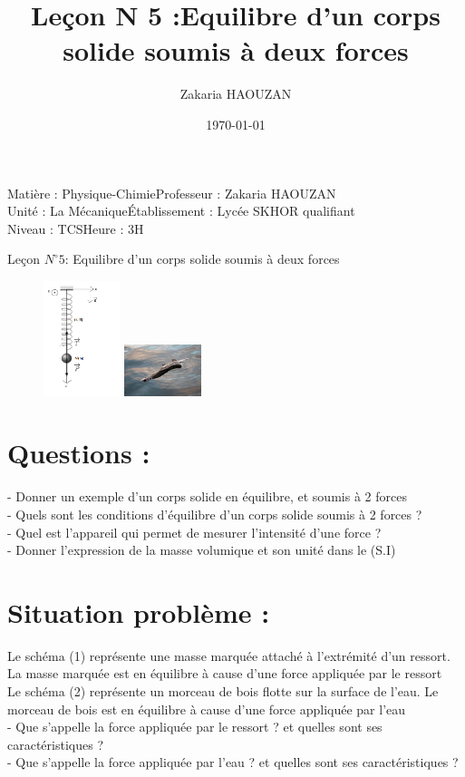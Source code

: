 \documentclass[12pt]{article}
\title{Leçon N 5 :Equilibre d’un corps solide soumis à deux forces }
\author{Zakaria HAOUZAN}
\date{\today}
\newcommand\headerMe[2]{\noindent{}#1\hfill#2}
\begin{document}
\headerMe{Matière : Physique-Chimie}{Professeur : Zakaria HAOUZAN}\\
\headerMe{Unité : La Mécanique}{Établissement : Lycée SKHOR qualifiant}\\
\headerMe{Niveau : TCS}{Heure : 3H}\\

\begin{center}
    \Large{Leçon $N^{\circ}5$: \color{red} Equilibre d’un corps solide soumis à deux forces }
\end{center}

\begin{figure}
\includegraphics[width=0.2\textwidth]{./img/img00.png}
\includegraphics[width=0.2\textwidth]{./img/img01.jpg}
\end{figure}



\section{Questions : }

 - Donner un exemple d’un corps solide en équilibre, et soumis à 2 forces
 \\- Quels sont les conditions d’équilibre d’un corps solide soumis à 2 forces ?
\\- Quel est l’appareil qui permet de mesurer l’intensité d’une force ?
\\- Donner l’expression de la masse volumique et son unité dans le
(S.I)

\section{Situation problème : }

Le schéma (1) représente une masse marquée attaché à l’extrémité
d’un ressort. La masse marquée est en équilibre à cause d’une force
appliquée par le ressort
\\Le schéma (2) représente un morceau de bois flotte sur la surface de
l’eau. Le morceau de bois est en équilibre à cause d’une force
appliquée par l’eau
\\ - Que s’appelle la force appliquée par le ressort ? et quelles sont ses
caractéristiques ?
\\ - Que s’appelle la force appliquée par l’eau ? et quelles sont ses
caractéristiques ?
\end{document}
